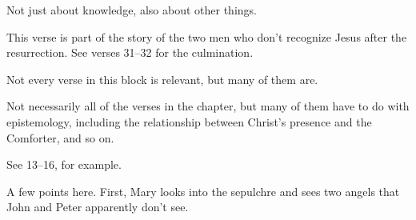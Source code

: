 \begin{compactdesc}
\begin{compactitem}
					\end{compactitem}
				\item[{\hyperref[LUKE-19-12]{Luke 19:12--27}}] \phantom{.}
					\begin{compactitem}
						\item Not just about knowledge, also about other things.
					\end{compactitem}
				\item[{\hyperref[LUKE-21-14]{Luke 21:14--15}}] \phantom{.}
				\item[{\hyperref[LUKE-24-16]{Luke 24:16}}] \phantom{.}
					\begin{compactitem}
						\item This verse is part of the story of the two men who don't recognize Jesus after the resurrection. See verses 31--32 for the culmination.
					\end{compactitem}
				\item[{\hyperref[LUKE-24-44]{Luke 24:44--45}}] \phantom{.}
				\item[{\hyperref[LUKE-24-49]{Luke 24:49}}] \phantom{.}
				\item[{\hyperref[JOHN-3-34]{John 3:34}}] \phantom{.}
				\item[{\hyperref[JOHN-4-39]{John 4:39--42}}] \phantom{.}
				\item[{\hyperref[JOHN-5-17]{John 5:17--47}}] \phantom{.}
					\begin{compactitem}
						\item Not every verse in this block is relevant, but many of them are.
					\end{compactitem}
				\item[{\hyperref[JOHN-7-16]{John 7:16--18}}] \phantom{.}
				\item[{\hyperref[JOHN-15-26]{John 15:26}}] \phantom{.}
				\item[{\hyperref[JOHN-16]{John 16}}] \phantom{.}
					\begin{compactitem}
						\item Not necessarily all of the verses in the chapter, but many of them have to do with epistemology, including the relationship between Christ's presence and the Comforter, and so on.
						\item See 13--16, for example.
					\end{compactitem}
				\item[{\hyperref[JOHN-20-5]{John 20:5--18}}] \phantom{.}
					\begin{compactitem}
						\item A few points here. First, Mary looks into the sepulchre and sees two angels that John and Peter apparently don't see.

\end{compactitem}
\end{compactdesc}
